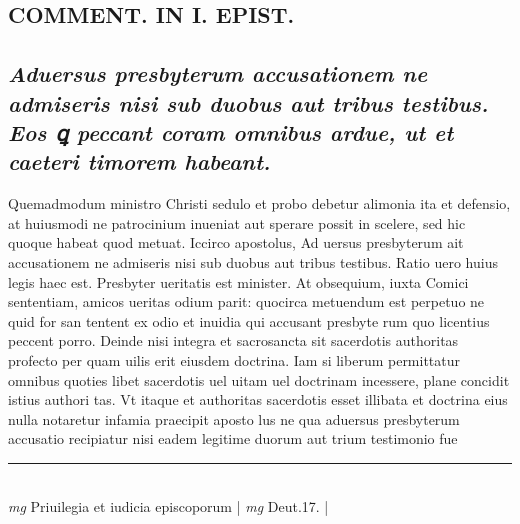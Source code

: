 \documentclass{article}
\begin{document}
\begin{pages}
\section*{COMMENT. IN I. EPIST. }
{}
\subsection*{\textit{Aduersus presbyterum accusationem ne admiseris nisi sub duobus aut tribus testibus. Eos ꝗ peccant coram omnibus ardue, ut et caeteri timorem habeant. }}\pstart Quemadmodum ministro Christi sedulo et probo debetur alimonia ita et defensio, at huiusmodi ne patrocinium inueniat aut sperare possit in scelere, sed hic quoque habeat quod metuat. Iccirco apostolus, Ad uersus presbyterum ait accusationem ne admiseris nisi sub duobus aut tribus testibus. Ratio uero huius legis haec est. Presbyter ueritatis est minister. At obsequium, iuxta Comici sententiam, amicos ueritas odium parit: quocirca metuendum est perpetuo ne quid for san tentent ex odio et inuidia qui accusant presbyte rum quo licentius peccent porro. Deinde nisi integra et sacrosancta sit sacerdotis authoritas profecto per quam uilis erit eiusdem doctrina. Iam si liberum permittatur omnibus quoties libet sacerdotis uel uitam uel doctrinam incessere, plane concidit istius authori tas. Vt itaque et authoritas sacerdotis esset illibata et doctrina eius nulla notaretur infamia praecipit aposto lus ne qua aduersus presbyterum accusatio recipiatur nisi eadem legitime duorum aut trium testimonio fue\pend
\vspace{0.5cm}\noindent
\vspace{0.2cm}\rule{1cm}{0.2pt}\\ 
\hspace{0.2cm}\textit{mg}
\footnotesize Priuilegia et iudicia episcoporum 
\normalsize| 
\hspace{0.2cm}\textit{mg}
\footnotesize Deut.17. 
\normalsize| 

\end{pages}
\end{document}
